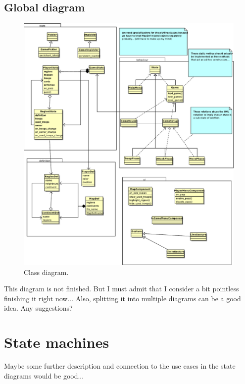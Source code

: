 \documentclass[12pt,a4paper]{article}
\let\stdsection\section
\renewcommand\section{\newpage\stdsection}
\begin{document}
\subsection{Global diagram}
\begin{figure}[H]
  \centering
  \includegraphics[width=14cm]{pic/8.pdf}
  \caption{Class diagram.}
  \label{fig:class}
\end{figure}

\begin{todo}
  This diagram is not finished. But I must admit that I consider a bit
  pointless finishing it right now... Also, splitting it into multiple
  diagrams can be a good idea. Any suggestions?
\end{todo}

\section{State machines}

\begin{todo}
  Maybe some further description and connection to the use cases in
  the state diagrams would be good...
\end{todo}
\end{document}
